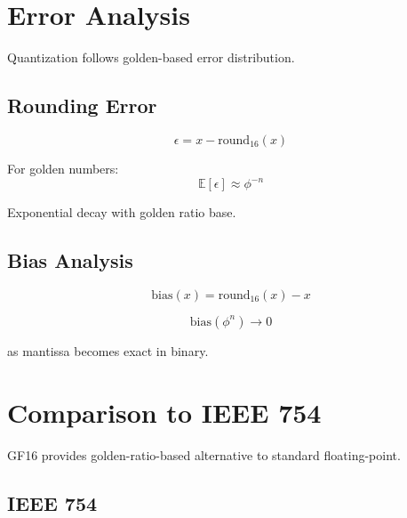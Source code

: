 \section{Error Analysis}

Quantization follows golden-based error distribution.

\subsection{Rounding Error}

\begin{definition}[GF16 Error]
\label{def:gf16-error}
\begin{equation}
\epsilon = x - \text{round}_{16}(x)
\end{equation}
\end{definition}

\begin{proposition}
\label{prop:golden-error}
For golden numbers:
\begin{equation}
\mathbb{E}[\epsilon] \approx \phi^{-n}
\end{equation}

Exponential decay with golden ratio base.
\end{proposition}

\subsection{Bias Analysis}

\begin{equation}
\text{bias}(x) = \text{round}_{16}(x) - x
\end{equation}

\begin{theorem}
\label{thm:golden-bias}
\begin{equation}
\text{bias}(\phi^n) \to 0
\end{equation}

as mantissa becomes exact in binary.
\end{theorem}

\section{Comparison to IEEE 754}

GF16 provides golden-ratio-based alternative to standard floating-point.

\subsection{IEEE 754}

